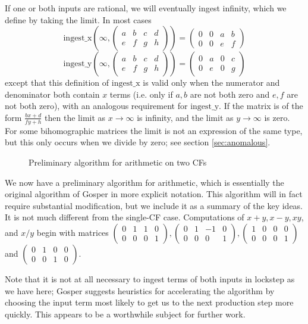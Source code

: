 \documentclass[11pt, oneside]{amsart}   	%
\newcommand{\bihomographic}[8]{\left(\begin{smallmatrix}#1&#2&#3&#4\\#5&#6&#7&#8\end{smallmatrix}\right)}
\newcommand{\abcd}{\left(
\begin{smallmatrix} 
a & b & c & d\\ 
e & f & g & h
\end{smallmatrix}
\right)}
\renewcommand{\:}{\negthickspace:\negthickspace}
\begin{document}
If one or both inputs are rational, we will eventually ingest infinity, which we define by taking the limit. In most cases
\[
\mbox{ingest\_x}(\infty, \abcd) = \bihomographic{0}{0}{a}{b} {0}{0}{e}{f}
\]
\[
\mbox{ingest\_y}(\infty, \abcd) = \bihomographic{0}{a}{0}{c}{0}{e}{0}{g}
\]
except that this definition of $\mbox{ingest\_x}$ is valid only when the numerator and denominator both contain $x$ terms
(i.e. only if $a,b$ are not both zero and $e,f$ are not both zero), with an analogous requirement for $\mbox{ingest\_y}$.
If the matrix is of the form $\frac{bx+d}{fy+h}$ then the limit as $x \to \infty$ is infinity, %
and the limit as $y \to \infty$  is zero. 
For some bihomographic matrices the limit is not an expression of the same type, but this only occurs when we divide by zero; see section \ref{sec:anomalous}.

\begin{figure}\label{fig:twoCFarithPrelim}
\begin{algorithmic}
 
 
\STATE{$M \gets \abcd$} 
           \ENDWHILE
\ENDWHILE
\end{algorithmic}
\caption{Preliminary algorithm for arithmetic on two CFs}
\end{figure}

We now have a preliminary algorithm for arithmetic, which is essentially the original algorithm of Gosper in more explicit notation. 
This algorithm will in fact require substantial modification, but we include it as a summary
of the key ideas. It is not much different from the single-CF case. Computations of $x+y, x-y,xy$, and $x/y$ begin with matrices
$\bihomographic{0}{1}{1}{0}{0}{0}{0}{1}, \bihomographic{0}{1}{-1}{0}{0}{0}{0}{1},
\bihomographic{1}{0}{0}{0}{0}{0}{0}{1}$ and $\bihomographic{0}{1}{0}{0}{0}{0}{1}{0}$.

Note that it is not at all necessary to ingest terms of both inputs in lockstep as we have here;
Gosper suggests heuristics for accelerating the algorithm by choosing the input term most likely to get us to the next production step
more quickly. This appears to be a worthwhile subject for further work.
\end{document}
